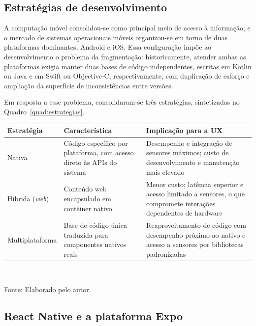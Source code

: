 \subsection{Estratégias de desenvolvimento}

A computação móvel consolidou-se como principal meio de acesso à informação, e o
mercado de sistemas operacionais móveis organizou-se em torno de duas plataformas
dominantes, Android e iOS. Essa configuração impõe ao desenvolvimento o problema
da fragmentação: historicamente, atender ambas as plataformas exigia manter duas
bases de código independentes, escritas em Kotlin ou Java e em Swift ou
Objective-C, respectivamente, com duplicação de esforço e ampliação da superfície
de inconsistências entre versões.

Em resposta a esse problema, consolidaram-se três estratégias, sintetizadas no
Quadro~\ref{quad:estrategias}.

\begin{quadro}[htb]
\centering
\caption{Estratégias de desenvolvimento de aplicações móveis}
\label{quad:estrategias}
\begin{tabular}{p{2.6cm} p{4.2cm} p{4.6cm}}
\toprule
\textbf{Estratégia} & \textbf{Característica} & \textbf{Implicação para a UX} \\
\midrule
Nativa & Código específico por plataforma, com acesso direto às APIs do sistema &
Desempenho e integração de sensores máximos; custo de desenvolvimento e
manutenção mais elevado \\
\addlinespace
Híbrida (\textit{web}) & Conteúdo web encapsulado em contêiner nativo &
Menor custo; latência superior e acesso limitado a sensores, o que compromete
interações dependentes de hardware \\
\addlinespace
Multiplataforma & Base de código única traduzida para componentes nativos reais &
Reaproveitamento de código com desempenho próximo ao nativo e acesso a sensores
por bibliotecas padronizadas \\
\bottomrule
\end{tabular}
\\[4pt]
\begin{flushleft}
Fonte: Elaborado pelo autor.
\end{flushleft}
\end{quadro}

\subsection{React Native e a plataforma Expo}

